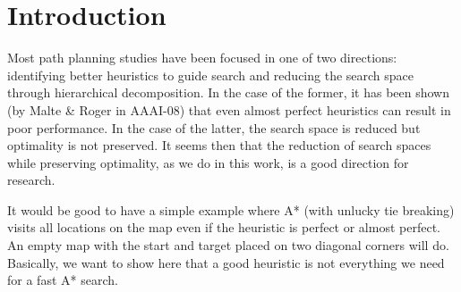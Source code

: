 \section{Introduction}
\label{ia-sec:introduction}
Most path planning studies have been focused in one of two directions: identifying better heuristics to guide search and reducing the search space through hierarchical decomposition.
In the case of the former, it has been shown (by Malte \& Roger in AAAI-08) that even almost perfect heuristics can result in poor performance. 
In the case of the latter, the search space is reduced but optimality is not preserved. 
It seems then that the reduction of search spaces while preserving optimality, as we do in this work, is a good direction for research.
\par
It would be good to have a simple example where A* (with unlucky tie breaking) visits all locations on the map even if the heuristic is perfect or almost perfect. 
An empty map with the start and target placed on two diagonal corners will do. Basically, we want to show here that a good heuristic is not everything we need for a fast A* search. 
\par
